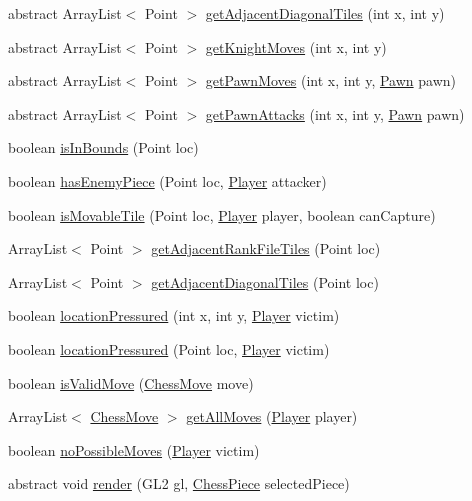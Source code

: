 \begin{DoxyCompactItemize}
abstract Array\-List$<$ Point $>$ \hyperlink{classmodel_1_1board_1_1_board_a5b3cecdde64a0a00a538fbc69e578f9c}{get\-Adjacent\-Diagonal\-Tiles} (int x, int y)
\item 
abstract Array\-List$<$ Point $>$ \hyperlink{classmodel_1_1board_1_1_board_ad65a4ec84fc3dad46f5b2f1e97ecc1b0}{get\-Knight\-Moves} (int x, int y)
\item 
abstract Array\-List$<$ Point $>$ \hyperlink{classmodel_1_1board_1_1_board_a4bd4b119f6f5669aaa2aab456056cd92}{get\-Pawn\-Moves} (int x, int y, \hyperlink{classmodel_1_1pieces_1_1_pawn}{Pawn} pawn)
\item 
abstract Array\-List$<$ Point $>$ \hyperlink{classmodel_1_1board_1_1_board_af75b477308f0cb632cf5e164246cd243}{get\-Pawn\-Attacks} (int x, int y, \hyperlink{classmodel_1_1pieces_1_1_pawn}{Pawn} pawn)
\item 
boolean \hyperlink{classmodel_1_1board_1_1_board_a20d22db525a1d022318b86cbfcd67e16}{is\-In\-Bounds} (Point loc)
\item 
boolean \hyperlink{classmodel_1_1board_1_1_board_a59b3e675b694301aef7e8f2cb6a1a65c}{has\-Enemy\-Piece} (Point loc, \hyperlink{classcontroller_1_1_player}{Player} attacker)
\item 
boolean \hyperlink{classmodel_1_1board_1_1_board_a1c27bff8bfe8cb594e6a576e5529b112}{is\-Movable\-Tile} (Point loc, \hyperlink{classcontroller_1_1_player}{Player} player, boolean can\-Capture)
\item 
Array\-List$<$ Point $>$ \hyperlink{classmodel_1_1board_1_1_board_ac8ffc792e85b09c00923dd593368d107}{get\-Adjacent\-Rank\-File\-Tiles} (Point loc)
\item 
Array\-List$<$ Point $>$ \hyperlink{classmodel_1_1board_1_1_board_a5279618349cb2950d412f6ebd563472b}{get\-Adjacent\-Diagonal\-Tiles} (Point loc)
\item 
boolean \hyperlink{classmodel_1_1board_1_1_board_a95aaad7f4888e5daa665b9b92021cf38}{location\-Pressured} (int x, int y, \hyperlink{classcontroller_1_1_player}{Player} victim)
\item 
boolean \hyperlink{classmodel_1_1board_1_1_board_af9083ec2d9d2193bca4af526f9f8dc99}{location\-Pressured} (Point loc, \hyperlink{classcontroller_1_1_player}{Player} victim)
\item 
boolean \hyperlink{classmodel_1_1board_1_1_board_ae68c80c70dcf77ddcbc81fa793103c31}{is\-Valid\-Move} (\hyperlink{classmodel_1_1_chess_move}{Chess\-Move} move)
\item 
Array\-List$<$ \hyperlink{classmodel_1_1_chess_move}{Chess\-Move} $>$ \hyperlink{classmodel_1_1board_1_1_board_a22726970b60922a6644715ebc441bc6d}{get\-All\-Moves} (\hyperlink{classcontroller_1_1_player}{Player} player)
\item 
boolean \hyperlink{classmodel_1_1board_1_1_board_a8e2c1b97adc00c2b91561bed8f79017d}{no\-Possible\-Moves} (\hyperlink{classcontroller_1_1_player}{Player} victim)
\item 
abstract void \hyperlink{classmodel_1_1board_1_1_board_a2680e928007fbd344f4640e053861883}{render} (G\-L2 gl, \hyperlink{classmodel_1_1_chess_piece}{Chess\-Piece} selected\-Piece)
\end{DoxyCompactItemize}
